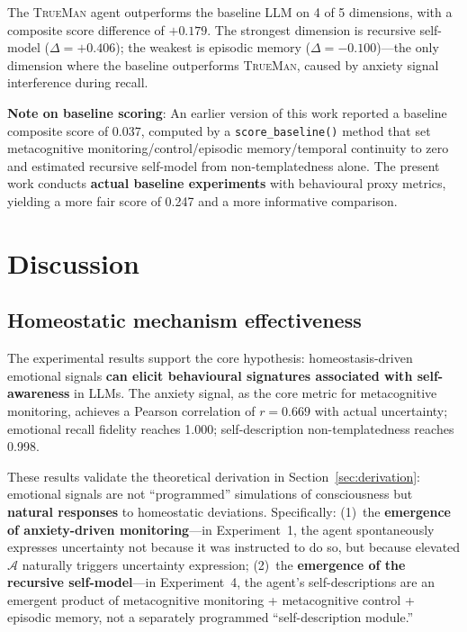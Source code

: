 \documentclass[pdflatex,sn-mathphys-num]{sn-jnl}
\newcommand{\TrueMan}{\textsc{TrueMan}}
\newcommand{\anxiety}{\mathcal{A}}
\theoremstyle{thmstyleone}%
\theoremstyle{thmstyletwo}%
\theoremstyle{thmstylethree}%
\begin{document}
The \TrueMan{} agent outperforms the baseline LLM on 4 of 5 dimensions, with a composite score difference of $+0.179$. The strongest dimension is recursive self-model ($\Delta = +0.406$); the weakest is episodic memory ($\Delta = -0.100$)---the only dimension where the baseline outperforms \TrueMan{}, caused by anxiety signal interference during recall.

\textbf{Note on baseline scoring}: An earlier version of this work reported a baseline composite score of 0.037, computed by a \texttt{score\_baseline()} method that set metacognitive monitoring/control/episodic memory/temporal continuity to zero and estimated recursive self-model from non-templatedness alone. The present work conducts \textbf{actual baseline experiments} with behavioural proxy metrics, yielding a more fair score of 0.247 and a more informative comparison.

\section{Discussion}\label{sec:discussion}

\subsection{Homeostatic mechanism effectiveness}

The experimental results support the core hypothesis: homeostasis-driven emotional signals \textbf{can elicit behavioural signatures associated with self-awareness} in LLMs. The anxiety signal, as the core metric for metacognitive monitoring, achieves a Pearson correlation of $r = 0.669$ with actual uncertainty; emotional recall fidelity reaches 1.000; self-description non-templatedness reaches 0.998.

These results validate the theoretical derivation in Section~\ref{sec:derivation}: emotional signals are not ``programmed'' simulations of consciousness but \textbf{natural responses} to homeostatic deviations. Specifically: (1)~the \textbf{emergence of anxiety-driven monitoring}---in Experiment~1, the agent spontaneously expresses uncertainty not because it was instructed to do so, but because elevated $\anxiety$ naturally triggers uncertainty expression; (2)~the \textbf{emergence of the recursive self-model}---in Experiment~4, the agent's self-descriptions are an emergent product of metacognitive monitoring + metacognitive control + episodic memory, not a separately programmed ``self-description module.''
\end{document}
